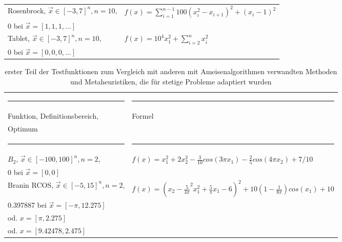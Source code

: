 \documentclass[fontsize=12, a4aper]{scrartcl}
\newcommand\Tstrut{\rule{0pt}{3ex}}           %
\begin{document}
\begin{table}[H]
\begin{tabularx}{\textwidth}{l|l}
			Rosenbrock, \(\overrightarrow{x} \in [-3,7]^n, n = 10\),  & \(f(x)=\sum_{i=1}^{n-1} 100 (x^2_i-x_{i+1})^2 + (x_i-1)^2\) \Tstrut\\
			0 bei \(\overrightarrow{x} = [1, 1, 1, ...]\) & \\
			
			Tablet, \(\overrightarrow{x} \in [-3,7]^n, n = 10\), & \(f(x)=10^4x_1^2 + \sum_{i=2}^{n}x^2_i \)\Tstrut\\
			0 bei \(\overrightarrow{x} = [0, 0, 0, ...]\) &
			
		\end{tabularx}
		
	\end{table}
	
	\bigskip
	
	\begin{table}[H]
		
		\fontsize{10pt}{12pt}
		
		\caption{erster Teil der Testfunktionen zum Vergleich mit anderen mit Ameisenalgorithmen verwandten Methoden und Metaheuristiken, die für stetige Probleme adaptiert wurden}
		
		\label{mittlereTestfunktionen}
		
		\begin{tabularx}{\textwidth}{l|l}
			
			\rule{6cm}{0.4pt} & \rule{9cm}{0.4pt}\\
			
			Funktion, Definitionsbereich, & Formel\\
			Optimum & \\
			
			\rule{6cm}{0.4pt} & \rule{9cm}{0.4pt}\\
			
			\(B_2\), \(\overrightarrow{x} \in [-100,100]^n, n = 2\), & \(f(x)=x_1^2 + 2x_2^2 - \frac{3}{10} cos(3 \pi x_1) -\frac{2}{5} cos(4 \pi x_2) +7/10\)\\
			0 bei \(\overrightarrow{x} = [0, 0]\) &\\
			
			Branin RCOS, \(\overrightarrow{x} \in [-5,15]^n, n = 2\),
			& \(f(x)=(x_2 - \frac{5}{4\pi}^2 x_1^2 + \frac{5}{\pi} x_1 - 6)^2 + 10 (1 - \frac{1}{8\pi})cos(x_1) + 10\)\Tstrut\\
			0.397887 bei \(\overrightarrow{x} = [-\pi , 12.275]\) & \\ 
			od. \(x = [\pi , 2.275]\) & \\
			od. \(x = [9.42478, 2.475]\) & \\
			

\end{tabularx}
\end{table}
\end{document}

